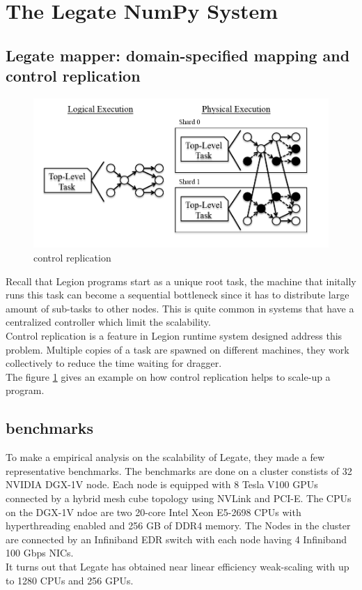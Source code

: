 \documentclass{article}
\newenvironment{newSec}[1]{
	\section{#1}
	\lhead{#1}
}{ \newpage }
\newenvironment{newSubsec}[1]{
	\subsection{#1}
}{}
\begin{document}
\begin{newSec}{The Legate NumPy System}
\begin{newSubsec}{Legate mapper: domain-specified mapping and control replication}
		\begin{figure}[htbp]
			\centering
			\includegraphics{fig/ctrl-repl.png}
			\caption{control replication}
			\label{fig:ctrlrepl}
		\end{figure}
		Recall that Legion programs start as a unique root task, the machine that initally runs this task can become a sequential bottleneck
		since it has to distribute large amount of sub-tasks to other nodes. This is quite common in systems that have a centralized controller
		which limit the scalability.\\
		Control replication is a feature in Legion runtime system designed address this problem.
		Multiple copies of a task are spawned on different machines, they work collectively to reduce the time waiting for dragger.\\
		The figure \ref{fig:ctrlrepl} gives an example on how control replication helps to scale-up a program.
	\end{newSubsec}

	\begin{newSubsec}{benchmarks}
		To make a empirical analysis on the scalability of Legate, they made a few representative benchmarks.
		The benchmarks are done on a cluster constists of 32 NVIDIA DGX-1V node.
		Each node is equipped with 8 Tesla V100 GPUs connected by a hybrid mesh cube topology using NVLink and PCI-E.
		The CPUs on the DGX-1V ndoe are two 20-core Intel Xeon E5-2698 CPUs with hyperthreading enabled and 256 GB of DDR4 memory.
		The Nodes in the cluster are connected by an Infiniband EDR switch with each node having 4 Infiniband 100 Gbps NICs.\\
		It turns out that Legate has obtained near linear efficiency weak-scaling with up to 1280 CPUs and 256 GPUs.


\end{newSubsec}
\end{newSec}
\end{document}
